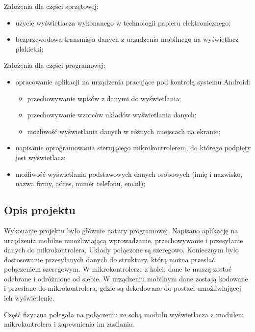 \documentclass[a4paper,12pt, twoside]{article}
\begin{document}
    	\begin{flushleft} Założenia dla części sprzętowej:
    	\begin{itemize}
    		\item użycie wyświetlacza wykonanego w technologii papieru elektronicznego;
    		\item bezprzewodowa transmisja danych z urządzenia mobilnego na wyświetlacz plakietki;
    	\end{itemize}
    	
    	\vspace{.5cm}
    	Założenia dla części programowej:
    	\begin{itemize}
    		\item opracowanie aplikacji na urządzenia pracujące pod kontrolą systemu Android:
    		\begin{itemize}
    		    \item przechowywanie wpisów z danymi do wyświetlania;
    		    \item przechowywanie wzorców układów wyświetlania danych;
    		    \item możliwość wyświetlania danych w różnych miejscach na ekranie;
    		\end{itemize}
    		\item napisanie oprogramowania sterującego mikrokontrolerem, do którego podpięty jest wyświetlacz;
    		\item możliwość wyświetlania podstawowych danych osobowych (imię i nazwisko, nazwa firmy, adres, numer telefonu, email);
    	\end{itemize}
    	\end{flushleft}
    	
    	\subsection{Opis projektu}
    	Wykonanie projektu było głównie natury programowej. Napisano aplikację na urządzenia mobilne umożliwiającą wprowadzanie, przechowywanie i przesyłanie danych do mikrokontrolera. Układy połączone są szeregowo. Koniecznym było dostosowanie przesyłanych danych do struktury, którą można przesłać połączeniem szeregowym. W mikrokontrolerze z kolei, dane te muszą zostać odebrane i odróżnione od siebie. W urządzeniu mobilnym dane zostają kodowane i przesłane do mikrokontrolera, gdzie są dekodowane do postaci umożliwiającej ich wyświetlenie.
    	
    	Część fizyczna polegała na połączeniu ze sobą modułu wyświetlacza z modułem mikrokontrolera i zapewnienia im zasilania. 
	
\end{document}
